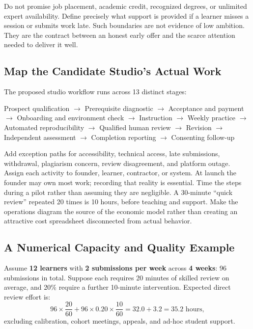 Do not promise job placement, academic credit, recognized degrees, or unlimited expert availability. Define precisely what support is provided if a learner misses a session or submits work late. Such boundaries are not evidence of low ambition. They are the contract between an honest early offer and the scarce attention needed to deliver it well.

\subsection{Map the Candidate Studio's Actual Work}
\label{sec:bayes_map_studio_work}

The proposed studio workflow runs across 13 distinct stages:
\begin{center}
\small
Prospect qualification $\longrightarrow$ Prerequisite diagnostic $\longrightarrow$ Acceptance and payment $\longrightarrow$ Onboarding and environment check $\longrightarrow$ Instruction $\longrightarrow$ Weekly practice $\longrightarrow$ Automated reproducibility $\longrightarrow$ Qualified human review $\longrightarrow$ Revision $\longrightarrow$ Independent assessment $\longrightarrow$ Completion reporting $\longrightarrow$ Consenting follow-up
\end{center}

Add exception paths for accessibility, technical access, late submissions, withdrawal, plagiarism concern, review disagreement, and platform outage. Assign each activity to founder, learner, contractor, or system. At launch the founder may own most work; recording that reality is essential. Time the steps during a pilot rather than assuming they are negligible. A 30-minute ``quick review'' repeated 20 times is 10 hours, before teaching and support. Make the operations diagram the source of the economic model rather than creating an attractive cost spreadsheet disconnected from actual behavior.

\subsection{A Numerical Capacity and Quality Example}
\label{sec:bayes_numerical_capacity}

Assume \textbf{12 learners} with \textbf{2 submissions per week} across \textbf{4 weeks}: 96 submissions in total. Suppose each requires 20 minutes of skilled review on average, and 20\% require a further 10-minute intervention. Expected direct review effort is:
\begin{equation}
96 \times \frac{20}{60} + 96 \times 0.20 \times \frac{10}{60} = 32.0 + 3.2 = 35.2\text{ hours},
\end{equation}
excluding calibration, cohort meetings, appeals, and ad-hoc student support.

